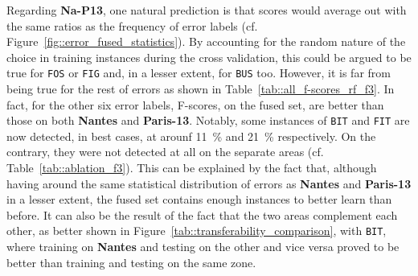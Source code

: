         Regarding \textbf{Na-P13}, one natural prediction is that scores would average out with the same ratios as the frequency of error labels (cf. Figure~\ref{fig::error_fused_statistics}).
        By accounting for the random nature of the choice in training instances during the cross validation, this could be argued to be true for \texttt{FOS} or \texttt{FIG} and, in a lesser extent, for \texttt{BUS} too.
        However, it is far from being true for the rest of errors as shown in Table~\ref{tab::all_f-scores_rf_f3}.
        In fact, for the other six error labels, F-scores, on the fused set, are better than those on both \textbf{Nantes} and \textbf{Paris-13}.
        Notably, some instances of \texttt{BIT} and \texttt{FIT} are now detected, in best cases, at arounf \SI{11}{\percent} and \SI{21}{\percent} respectively.
        On the contrary, they were not detected at all on the separate areas (cf. Table~\ref{tab::ablation_f3}).
        This can be explained by the fact that, although having around the same statistical distribution of errors as \textbf{Nantes} and \textbf{Paris-13} in a lesser extent, the fused set contains enough instances to better learn than before.
        It can also be the result of the fact that the two areas complement each other, as better shown in Figure~\ref{tab::transferability_comparison}, with \texttt{BIT}, where training on \textbf{Nantes} and testing on the other and vice versa proved to be better than training and testing on the same zone.\\
        
        \begin{figure}[htpb]
            \centering
        \end{figure}
    
